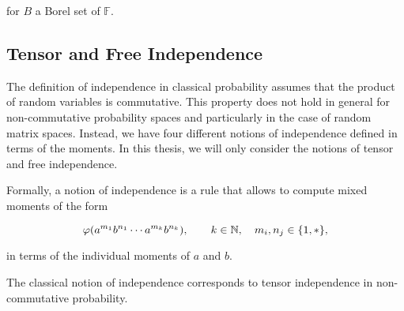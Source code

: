     \noindent for $B$ a Borel set of $\mathbb F$.




\subsection{Tensor and Free Independence}

    The definition of independence in classical probability assumes that the product of random variables is commutative. This property does not hold in general for non-commutative probability spaces and particularly in the case of random matrix spaces. Instead, we have four different notions of independence defined in terms of the moments. In this thesis, we will only consider the notions of tensor and free independence.

    Formally, a notion of independence is a rule that allows to compute mixed moments of the form

    \begin{equation*}
        \varphi(a^{m_1}b^{n_1} \cdots a^{m_{k}}b^{n_k}), \qquad k \in \mathbb N, \quad m_i, n_j \in \{1,*\},
    \end{equation*}

    \noindent in terms of the individual moments of $a$ and $b$.

    The classical notion of independence corresponds to tensor independence in non-commutative probability.

